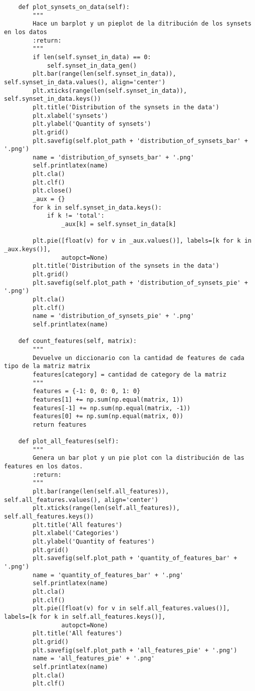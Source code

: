 \documentclass[12,twoside]{TFG-GM}
\theoremstyle{definition}
\theoremstyle{remark}
\begin{document}
\begin{verbatim}
    def plot_synsets_on_data(self):
        """
        Hace un barplot y un pieplot de la ditribución de los synsets en los datos
        :return:
        """
        if len(self.synset_in_data) == 0:
            self.synset_in_data_gen()
        plt.bar(range(len(self.synset_in_data)), self.synset_in_data.values(), align='center')
        plt.xticks(range(len(self.synset_in_data)), self.synset_in_data.keys())
        plt.title('Distribution of the synsets in the data')
        plt.xlabel('synsets')
        plt.ylabel('Quantity of synsets')
        plt.grid()
        plt.savefig(self.plot_path + 'distribution_of_synsets_bar' + '.png')
        name = 'distribution_of_synsets_bar' + '.png'
        self.printlatex(name)
        plt.cla()
        plt.clf()
        plt.close()
        _aux = {}
        for k in self.synset_in_data.keys():
            if k != 'total':
                _aux[k] = self.synset_in_data[k]

        plt.pie([float(v) for v in _aux.values()], labels=[k for k in _aux.keys()],
                autopct=None)
        plt.title('Distribution of the synsets in the data')
        plt.grid()
        plt.savefig(self.plot_path + 'distribution_of_synsets_pie' + '.png')
        plt.cla()
        plt.clf()
        name = 'distribution_of_synsets_pie' + '.png'
        self.printlatex(name)

    def count_features(self, matrix):
        """
        Devuelve un diccionario con la cantidad de features de cada tipo de la matriz matrix
        features[category] = cantidad de category de la matriz
        """
        features = {-1: 0, 0: 0, 1: 0}
        features[1] += np.sum(np.equal(matrix, 1))
        features[-1] += np.sum(np.equal(matrix, -1))
        features[0] += np.sum(np.equal(matrix, 0))
        return features

    def plot_all_features(self):
        """
        Genera un bar plot y un pie plot con la distribución de las features en los datos.
        :return:
        """
        plt.bar(range(len(self.all_features)), self.all_features.values(), align='center')
        plt.xticks(range(len(self.all_features)), self.all_features.keys())
        plt.title('All features')
        plt.xlabel('Categories')
        plt.ylabel('Quantity of features')
        plt.grid()
        plt.savefig(self.plot_path + 'quantity_of_features_bar' + '.png')
        name = 'quantity_of_features_bar' + '.png'
        self.printlatex(name)
        plt.cla()
        plt.clf()
        plt.pie([float(v) for v in self.all_features.values()], labels=[k for k in self.all_features.keys()],
                autopct=None)
        plt.title('All features')
        plt.grid()
        plt.savefig(self.plot_path + 'all_features_pie' + '.png')
        name = 'all_features_pie' + '.png'
        self.printlatex(name)
        plt.cla()
        plt.clf()


\end{verbatim}
\end{document}
